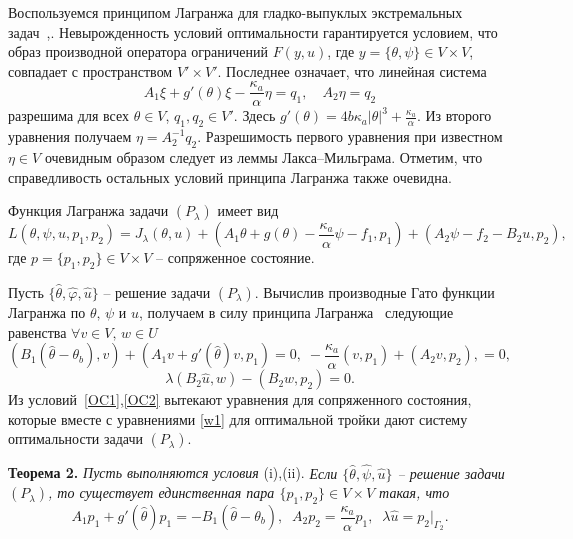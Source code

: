 \documentclass[12pt]{article}
\begin{document}
    Воспользуемся принципом
    Лагранжа для гладко-выпуклых экстремальных задач~\cite{10},\cite{11}. Невырожденность условий оптимальности гарантируется условием, что
    образ производной
    оператора ограничений $F(y, u)$, где $y=\{\theta,\psi\}\in V\times V$,
    совпадает с пространством $V'\times V'.$  Последнее означает, что
    линейная система
    $$
    A_1\xi+g'(\theta)\xi-\frac{\kappa_a}{\alpha}\eta=q_1,\quad
    A_2\eta=q_2
    $$
    разрешима для всех $\theta\in V$, $q_1,q_2\in V'.$ Здесь
    $g'(\theta)=4b\kappa_a|\theta|^3+\frac{\kappa_a}{\alpha}.$
    Из второго уравнения получаем $\eta=A_2^{-1}q_2.$ Разрешимость первого уравнения при известном $\eta\in V$ очевидным образом следует из леммы Лакса--Мильграма. Отметим, что справедливость остальных условий принципа Лагранжа также очевидна.

    Функция Лагранжа задачи $(P_\lambda)$
    имеет вид
    \[
        L(\theta, \psi, u, p_1, p_2) = J_\lambda(\theta, u)
        + (A_1\theta+g(\theta)-\frac{\kappa_a}{\alpha}\psi-f_1 ,p_1)+
        (A_2\psi-f_2-B_2u,p_2),
    \]
    где $p=\{p_1,p_2\}\in V\times V$ -- сопряженное состояние.

    Пусть $\{\hat{\theta}, \hat{\varphi}, \hat{u} \}$ -- решение задачи
    $(P_\lambda)$. Вычислив производные Гато функции Лагранжа по $\theta,\,\psi$ и $u$, получаем
    в силу принципа Лагранжа~\cite[Теорема 1.5]{10} следующие равенства
    $\forall v\in V,\, w\in U$
    \begin{equation}
        \label{OC1}
        (B_1(\hat{\theta} -\theta_b), v) + (A_1v+g'(\hat{\theta})v,p_1)=0,\;
        -\frac{\kappa_a}{\alpha}(v ,p_1)+
        (A_2v,p_2),    = 0,
    \end{equation}
    \begin{equation}
        \label{OC2}
        \lambda(B_2\hat{u},w) - (B_2w, p_2) = 0.
    \end{equation}
    Из условий~\eqref{OC1},\eqref{OC2} вытекают уравнения для сопряженного состояния, которые вместе с уравнениями \eqref{w1}
    для оптимальной тройки дают систему оптимальности задачи $(P_\lambda)$.

    \textbf{Теорема 2.}
    \textit{ Пусть выполняются условия} (i),(ii).
    \textit{ Если $\{\hat{\theta}, \hat{\psi}, \hat{u}\}$ -- решение
    задачи $(P_\lambda)$, то существует единственная пара $\{p_1, p_2 \} \in V\times V$
        такая, что}
    \begin{equation}
        \label{AS}
        A_1p_1+g'(\hat{\theta}) p_1=-B_1(\hat{\theta} -\theta_b),\;\;
        A_2p_2=\frac{\kappa_a}{\alpha}p_1,\;\;
        \lambda\hat{u}=p_2|_{\Gamma_2}.
    \end{equation}
\end{document}
